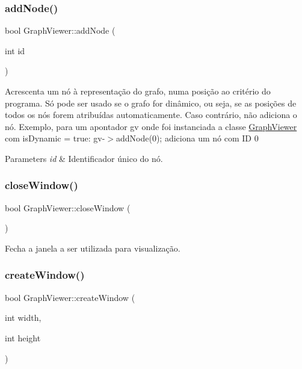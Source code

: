 \subsubsection{\texorpdfstring{add\+Node()}{addNode()}\hspace{0.1cm}{\footnotesize\ttfamily [2/2]}}
{\footnotesize\ttfamily bool Graph\+Viewer\+::add\+Node (\begin{DoxyParamCaption}\item[{int}]{id }\end{DoxyParamCaption})}

Acrescenta um nó à representação do grafo, numa posição ao critério do programa. Só pode ser usado se o grafo for dinâmico, ou seja, se as posições de todos os nós forem atribuídas automaticamente. Caso contrário, não adiciona o nó. Exemplo, para um apontador gv onde foi instanciada a classe \mbox{\hyperlink{class_graph_viewer}{Graph\+Viewer}} com is\+Dynamic = true\+: gv-\/$>$add\+Node(0); adiciona um nó com ID 0


\begin{DoxyParams}{Parameters}
{\em id} & Identificador único do nó. \\
\hline
\end{DoxyParams}
\mbox{\label{class_graph_viewer_a85990c1eaac7feed3950960d4bd2fd4c}} 
\subsubsection{\texorpdfstring{close\+Window()}{closeWindow()}}
{\footnotesize\ttfamily bool Graph\+Viewer\+::close\+Window (\begin{DoxyParamCaption}{ }\end{DoxyParamCaption})}

Fecha a janela a ser utilizada para visualização. \mbox{\label{class_graph_viewer_ae5247dc66449dcd21fc5d531bbbaddfa}} 
\subsubsection{\texorpdfstring{create\+Window()}{createWindow()}}
{\footnotesize\ttfamily bool Graph\+Viewer\+::create\+Window (\begin{DoxyParamCaption}\item[{int}]{width,  }\item[{int}]{height }\end{DoxyParamCaption})}

